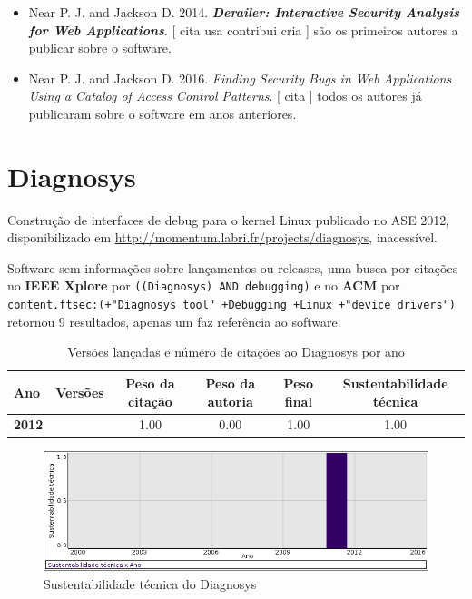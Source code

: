 \begin{itemize}
\item Near P. J. and Jackson D.
      2014.
        \textbf{\textit{ Derailer: Interactive Security Analysis for Web Applications}}.
      [
          cita
          usa
          contribui
          cria
      ]
são os primeiros autores a publicar sobre o software.
\item Near P. J. and Jackson D.
      2016.
        \textit{ Finding Security Bugs in Web Applications Using a Catalog of Access Control Patterns}.
      [
          cita
      ]
todos os autores já publicaram sobre o software em anos anteriores.
\end{itemize}
\section{Diagnosys}

Construção de interfaces de debug para o kernel Linux
publicado no ASE 2012,
disponibilizado em \url{http://momentum.labri.fr/projects/diagnosys},
inacessível.

Software sem informações sobre lançamentos ou releases,
uma busca por citações no {\bf IEEE Xplore} por
\texttt{((Diagnosys) AND debugging)}
e no {\bf ACM} por
\texttt{content.ftsec:(+"Diagnosys tool" +Debugging +Linux +"device drivers")}
retornou
9 resultados,
apenas um faz referência ao software.


\begin{table}[H]
\caption{Versões lançadas e número de citações ao Diagnosys por ano}
\centering
\begin{tabular}{| l | c | c | c | c | c |}
  \hline
  Ano & Versões & Peso da citação & Peso da autoria & Peso final & Sustentabilidade técnica \\
  \hline
            {\bf 2012}
          &
          
          &
          1.00
          &
          0.00
          &
          1.00
          &
            {\color{blue} 1.00}
          \\
\hline
\end{tabular}
\end{table}

\begin{figure}[h]
  \center
  \includegraphics[scale=0.50]{result-documents/charts/diagnosys.png}
  \caption{Sustentabilidade técnica do Diagnosys}
\end{figure}



